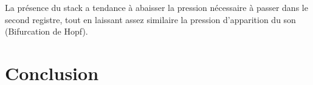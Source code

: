 \documentclass[atiam, article]{rapport} %
\begin{document}
La présence du stack a tendance à abaisser la pression nécessaire à passer dans le second registre, tout en laissant assez similaire la pression d'apparition du son (Bifurcation de Hopf). %

\printbibliography

\section{Conclusion}
\end{document}
